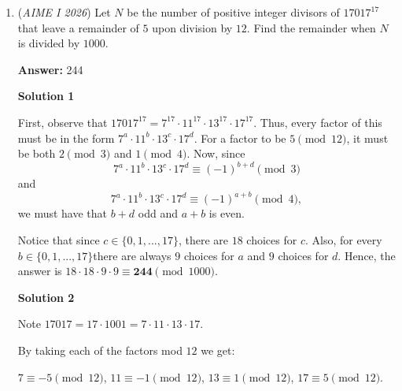 \begin{enumerate}
 Case G: \( 3+3 \)

 Two cycles of \( 3 \). For the first, we have $\binom{6}{3} = 20$ ways. For the second, only \( 2 \). Then, we have \( 40 \) cases.

 Case H: \( 6 \)

 One cycle of \( 6 \). We have \( (a,b,c,d,e,f) \), but swapping the endpoints are the same due to cyclic rotations. For the six elements there are \( 6 \) cases for the two that get swapped, and thus we divide the overcount by \( 6 \). Then, there are \( (6-1)! = 5! = 120 \) possibilities.

 Alas, we have to add all \( 8 \) partitions, to obtain

 
 \[1 + 15 + 45 + 15 + 40 + 120 + 40 + 120 = 396\]

 The answer is clearly $\boxed{396}$.

 


	\item (\textit{AIME I 2026}) Let $N$ be the number of positive integer divisors of $17017^{17}$ that leave a remainder of $5$ upon division by $12$. Find the remainder when $N$ is divided by $1000$.


 
 \textbf{Answer: }244



\textbf{Solution 1}

First, observe that $17017^{17}=7^{17}\cdot 11^{17}\cdot 13^{17}\cdot 17^{17}$. Thus, every factor of this must be in the form $7^a\cdot 11^b\cdot 13^c\cdot 17^d$. For a factor to be $5\pmod{12}$, it must be both $2\pmod{3}$ and $1\pmod{4}$. Now, since 
 \[7^a\cdot 11^b\cdot 13^c\cdot 17^d\equiv (-1)^{b+d}\pmod{3}\] and 
 \[7^a\cdot 11^b\cdot 13^c\cdot 17^d\equiv (-1)^{a+b}\pmod{4},\]we must have that $b+d$ odd and $a+b$ is even.

 Notice that since $c\in \{0, 1, ..., 17\}$, there are $18$ choices for $c$. Also, for every $b\in\{0, 1, ..., 17\}$there are always $9$ choices for $a$ and $9$ choices for $d$. Hence, the answer is $18\cdot 18\cdot 9\cdot 9\equiv \boxed{\textbf{244}}\pmod{1000}$.

 



\textbf{Solution 2}

Note $17017=17\cdot1001=7\cdot11\cdot13\cdot17$.

 By taking each of the factors mod $12$ we get:

 $7\equiv-5\pmod{12}$, $11\equiv-1\pmod{12}$, $13\equiv1\pmod{12}$, $17\equiv5\pmod{12}$.


\end{enumerate}
